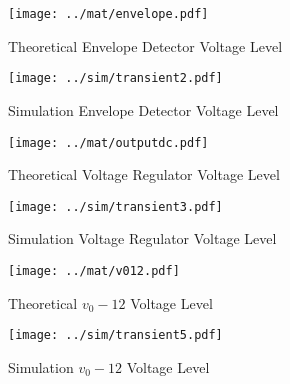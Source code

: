 \begin{figure}[H]
      \texttt{[image: ../mat/envelope.pdf]}
      \caption{Theoretical Envelope Detector Voltage Level}
    \endminipage\hfill
      \texttt{[image: ../sim/transient2.pdf]}
      \caption{Simulation Envelope Detector Voltage Level}
    \endminipage\hfill
\end{figure}

\begin{figure}[H]
      \texttt{[image: ../mat/outputdc.pdf]}
      \caption{Theoretical Voltage Regulator Voltage Level}
    \endminipage\hfill
      \texttt{[image: ../sim/transient3.pdf]}
      \caption{Simulation Voltage Regulator Voltage Level}
    \endminipage\hfill
\end{figure}

\begin{figure}[H]
      \texttt{[image: ../mat/v012.pdf]}
      \caption{Theoretical $v_0-12$ Voltage Level}
    \endminipage\hfill
      \texttt{[image: ../sim/transient5.pdf]}
      \caption{Simulation $v_0-12$ Voltage Level}
    \endminipage\hfill
\end{figure}

